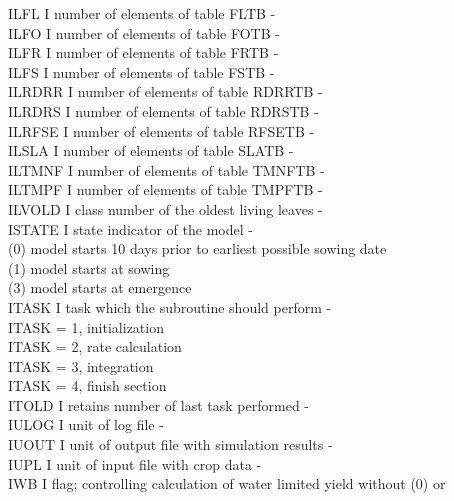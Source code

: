 \begin{tabbing}
ILFL\> \> I\> number of elements of table FLTB\> \> \> \> \> \> \> -\\
ILFO\> \> I\> number of elements of table FOTB\> \> \> \> \> \> \> -\\
ILFR\> \> I\> number of elements of table FRTB\> \> \> \> \> \> \> -\\
ILFS\> \> I\> number of elements of table FSTB\> \> \> \> \> \> \> -\\
ILRDRR\> \> I\> number of elements of table RDRRTB\> \> \> \> \> \> \> -\\
ILRDRS\> \> I\> number of elements of table RDRSTB\> \> \> \> \> \> \> -\\
ILRFSE\> \> I\> number of elements of table RFSETB\> \> \> \> \> \> \> -\\
ILSLA\> \> I\> number of elements of table SLATB\> \> \> \> \> \> \> -\\
ILTMNF\> \> I\> number of elements of table TMNFTB\> \> \> \> \> \> \> -\\
ILTMPF\> \> I\> number of elements of table TMPFTB\> \> \> \> \> \> \> -\\
ILVOLD  \> \> I   \> class number of the oldest living leaves           \> \> \> \> \> \> \> -\\
ISTATE\> \> I\> state indicator of the model\> \> \> \> \> \> \> -\\
\>\> \> (0) model starts 10 days prior to earliest possible sowing date\\
\>\> \> (1) model starts at sowing\\
\>\> \> (3) model starts at emergence\\
ITASK\> \> I\> task which the subroutine should perform\> \> \> \> \> \> \> -\\
\>\> \> ITASK = 1, initialization\\
\>\> \> ITASK = 2, rate calculation\\
\>\> \> ITASK = 3, integration\\
\>\> \> ITASK = 4, finish section\\
ITOLD\> \> I\> retains number of last task performed\> \> \> \> \> \> \> -\\
IULOG\> \> I\> unit of log file\> \> \> \> \> \> \> -\\
IUOUT\> \> I\> unit of output file with simulation results\> \> \> \> \> \> \> -\\
IUPL\> \> I \> unit of input file with crop data\> \> \> \> \> \> \> -\\
IWB     \> \> I\> flag; controlling calculation of water limited yield without (0) or \\

\end{tabbing}
